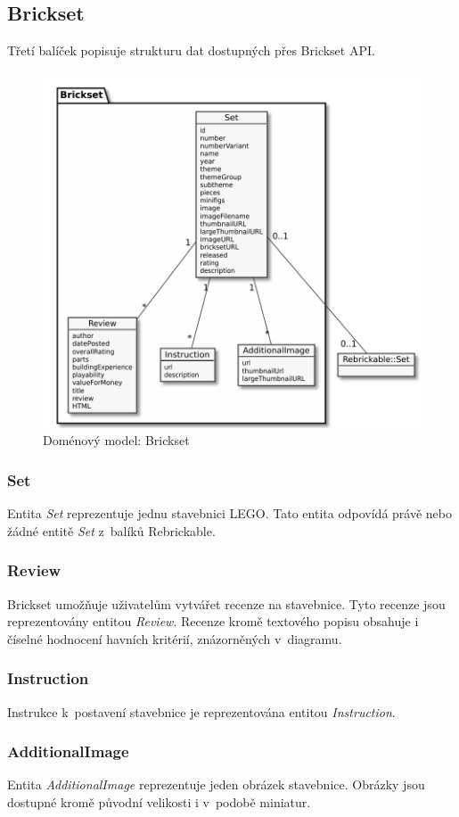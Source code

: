 \subsection{Brickset}
Třetí balíček popisuje strukturu dat dostupných přes Brickset \gls{API}.   

\begin{figure}[htbp]
    \centering
    \includegraphics[width=\textwidth,height=\textheight,keepaspectratio]{pdfs/domain_brickset}
    \caption{Doménový model: Brickset \label{diagram-domenovy-brickset}}
\end{figure}

\subsubsection*{Set}
Entita \textit{Set} reprezentuje jednu stavebnici LEGO. Tato entita odpovídá právě nebo žádné entitě \textit{Set} z~balíků Rebrickable.  

\subsubsection*{Review}
Brickset umožňuje uživatelům vytvářet recenze na stavebnice. Tyto recenze jsou reprezentovány entitou \textit{Review}. Recenze kromě textového popisu obsahuje i číselné hodnocení havních kritérií, znázorněných v~diagramu.

\subsubsection*{Instruction} 
Instrukce k~postavení stavebnice je reprezentována entitou \textit{Instruction}.

\subsubsection*{AdditionalImage} 
Entita \textit{AdditionalImage} reprezentuje jeden obrázek stavebnice. Obrázky jsou dostupné kromě původní velikosti i v~podobě miniatur.


